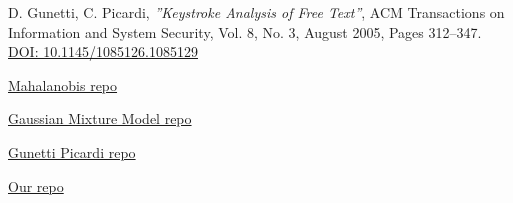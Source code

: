 \begin{thebibliography}{99}
D. Gunetti, C. Picardi, \textit{''Keystroke Analysis of Free Text''}, ACM Transactions on Information and System Security, Vol. 8, No. 3, August 2005, Pages 312–347.
\href{https://doi.org/10.1145/1085126.1085129}{DOI: 10.1145/1085126.1085129}

 \href{https://github.com/rehassachdeva/Anomaly-Detection-for-Keystroke-Dynamics/blob/master/MahalanobisDetector.ipynb}{Mahalanobis repo}

\href{https://github.com/josefmalmstrom/gmm-keystroke/blob/master/train_gmm.py}{Gaussian Mixture Model repo}

\href{https://github.com/das-group/Robustness-of-Keystroke-Biometrics/blob/main/Artifacts/algorithms/free-text/kd-analysis-free-text.ipynb}{Gunetti Picardi repo}

\href{https://github.com/mon-drive/keystroke-recognition.git}{Our repo}
\end{thebibliography}
